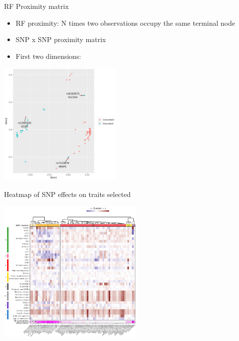 \documentclass[presentation]{beamer}
\begin{document}
\begin{frame}[label={sec:org32a3154}]{RF Proximity matrix}
\begin{itemize}
\item RF proximity: N times two observations occupy the same terminal node
\item SNP x SNP proximity matrix
\item First two dimensions:
\end{itemize}
\begin{center}
\includegraphics[width=6cm]{./plots/mds_phen.png}
\end{center}
\end{frame}

\begin{frame}[label={sec:org5b9df10}]{Heatmap of SNP effects on traits selected}
\begin{center}
\includegraphics[width=7cm]{./plots/phen_hm.png}
\end{center}
\end{frame}
\end{document}
